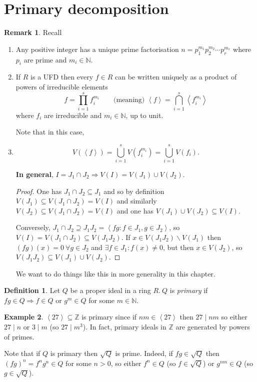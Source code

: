\documentclass[a4paper]{article}
\newcommand{\la}{\left\langle}
\newcommand{\ra}{\right\rangle}
\newcommand{\Z}{\mathbb Z}
\theoremstyle{definition}
\newtheorem{defn}{Definition}[subsection]
\newtheorem{example}[defn]{Example}
\newtheorem*{remark}{Remark}
\begin{document}
\section{Primary decomposition}
\begin{remark}
Recall
\begin{enumerate}
\item Any positive integer has a unique prime factorisation $n=p_1^{m_1}p_2^{m_2}\cdots p_r^{m_r}$ where $p_i$ are prime and $m_i\in\mathbb N$.
\item If $R$ is a UFD then every $f\in R$ can be written uniquely as a product of powers of irreducible elements
\[
f=\prod_{i=1}^s f_i^{m_i}\qquad \text{(meaning) } \la f\ra=\bigcap_{i=1}^s \la f_i^{m_i}\ra
\]
where $f_i$ are irreducible and $m_i\in\mathbb N$, up to unit.

Note that in this case,
\item \[
V(\la f\ra)=\bigcup_{i=1}^s V(f_i^{m_i})=\bigcup_{i=1}^s V(f_i).
\]

\textbf{In general}, $I=J_1\cap J_2\Rightarrow V(I)=V(J_1)\cup V(J_2)$.
\begin{proof}
One has $J_1\cap J_2\subseteq J_1$ and so by definition $V(J_1)\subseteq V(J_1\cap J_2)=V(I)$ and similarly $V(J_2)\subseteq V(J_1\cap J_2)=V(I)$ and one has $V(J_1)\cup V(J_2)\subseteq V(I)$.

Conversely, $J_1\cap J_2\supseteq J_1J_2=\la fg:f\in J_1,g\in J_2\ra$, so $V(I)=V(J_1\cap J_2)\subseteq V(J_1J_2)$. If $x\in V(J_1J_2)\backslash V(J_1)$ then $(fg)(x)=0 \ \forall g\in J_2$ and $\exists f\in J_1:f(x)\neq 0$, but then $x\in V(J_2)$, so $V(J_1J_2)\subseteq V(J_1)\cup V(J_2)$.
\end{proof}

We want to do things like this in more generality in this chapter.
\end{enumerate}
\end{remark}

\begin{defn}
Let $Q$ be a proper ideal in a ring $R.\ Q$ is \textit{primary} if $fg\in Q\Rightarrow f\in Q$ or $g^m\in Q$ for some $m\in\mathbb N$.
\end{defn}
\begin{example}
$\la27\ra\subseteq\Z$ is primary since if $nm\in\la27\ra$ then $27\mid nm$ so either $27\mid n$ or $3\mid m$ (so $27\mid m^3$). In fact, primary ideals in $\Z$ are generated by powers of primes.
\end{example}

Note that if $Q$ is primary then $\sqrt Q$ is prime. Indeed, if $fg\in\sqrt Q$ then $(fg)^n=f^ng^n\in Q$ for some $n>0$, so either $f^n\in Q$ (so $f\in\sqrt Q$) or $g^{nm}\in Q$ (so $g\in\sqrt Q$).
\end{document}
